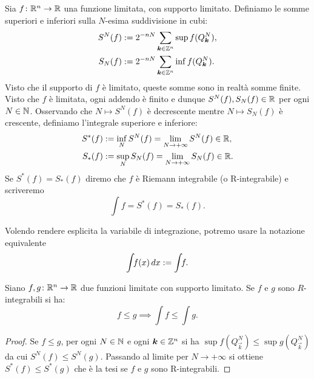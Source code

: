 \begin{definition}
  \label{def:integrale_riemann}
Sia $f\colon {\mathbb R}^n \to {\mathbb R}$ una funzione limitata, 
con supporto limitato.
Definiamo le somme superiori e inferiori sulla $N$-esima suddivisione in cubi:
\begin{align*}
    S^N(f) &:= 2^{-nN}\sum_{\boldsymbol k\in {\mathbb Z}^n} \sup f(Q^N_{\boldsymbol k}), \\
    S_N(f) &:= 2^{-nN}\sum_{\boldsymbol k\in {\mathbb Z}^n} \inf f(Q^N_{\boldsymbol k}).
\end{align*}
Visto che il supporto di $f$ è limitato, queste somme sono in realtà 
somme finite. Visto che $f$ è limitata, ogni addendo è finito e dunque 
$S^N(f), S_N(f) \in {\mathbb R}$ per ogni $N\in {\mathbb N}$.
Osservando che $N\mapsto S^N(f)$ è decrescente 
mentre $N\mapsto S_N(f)$ è crescente, definiamo
l'integrale superiore e inferiore:
\begin{align*}
    S^*(f) &:= \inf_N S^N(f) = \lim_{N\to +\infty} S^N(f) \in {\mathbb R}, \\
    S_*(f) &:= \sup_N S_N(f) = \lim_{N\to +\infty} S_N(f) \in {\mathbb R}.
\end{align*}
Se $S^*(f)=S_*(f)$ diremo che $f$ è Riemann integrabile (o R-integrabile)
e scriveremo
\[
  \int\!\! f = S^*(f) = S_*(f).
\]

Volendo rendere esplicita la variabile di integrazione, potremo
usare la notazione equivalente
\[
  \int\!\! f(x)\, dx := \int\!\! f.
\]
\end{definition}

\begin{theorem}
Siano $f,g\colon {\mathbb R}^n\to{\mathbb R}$ due funzioni limitate con supporto limitato.
Se $f$ e $g$ sono $R$-integrabili si ha:
\[
  f \le g \implies \int\!\! f \le \int\!\! g.
\]
\end{theorem}
%
\begin{proof}
Se $f\le g$, per ogni $N\in {\mathbb N}$ e ogni $\boldsymbol k \in {\mathbb Z}^n$ si ha 
$\sup f(Q^N_{\vec k}) \le \sup g(Q^N_{\vec k})$
da cui 
$S^N(f) \le S^N(g)$.
Passando al limite per $N\to +\infty$ si ottiene
$S^*(f) \le S^*(g)$
che è la tesi se $f$ e $g$ sono R-integrabili.
\end{proof}

